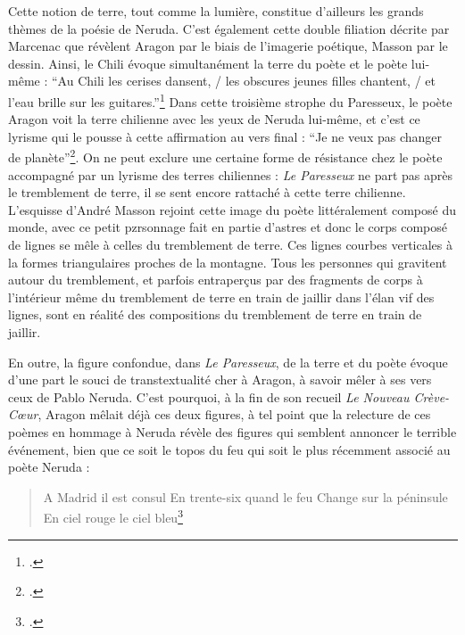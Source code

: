 Cette notion de terre, tout comme la lumière, constitue d’ailleurs les grands thèmes de la poésie de Neruda. C’est également cette double filiation décrite par Marcenac que révèlent Aragon par le biais de l’imagerie poétique, Masson par le dessin. Ainsi, le Chili évoque simultanément la terre du poète et le poète lui-même : \enquote{Au Chili les cerises dansent, / les obscures jeunes filles chantent, / et l'eau brille sur les guitares.}\footcite{pabloneruda} Dans cette troisième strophe du Paresseux, le poète Aragon voit la terre chilienne avec les yeux de Neruda lui-même, et c’est ce lyrisme qui le pousse à cette affirmation au vers final : \enquote{Je ne veux pas changer de planète}\footcite{pabloneruda}.  On ne peut exclure une certaine forme de résistance chez le poète accompagné par un lyrisme des terres chiliennes : \emph{Le Paresseux }ne part pas après le tremblement de terre, il se sent encore rattaché à cette terre chilienne. L’esquisse d’André Masson rejoint cette image du poète littéralement composé du monde, avec ce petit pzrsonnage fait en partie d’astres et donc le corps composé de lignes se mêle à celles du tremblement de terre. Ces lignes courbes verticales à la formes triangulaires proches de la montagne. Tous les personnes qui gravitent autour du tremblement, et parfois entraperçus par des fragments de corps à l’intérieur même du tremblement de terre en train de jaillir dans l’élan vif des lignes, sont en réalité des compositions du tremblement de terre en train de jaillir. 

	En outre, la figure confondue, dans \emph{Le Paresseux}, de la terre et du poète évoque d’une part le souci de transtextualité cher à Aragon, à savoir mêler à ses vers ceux de Pablo Neruda. C’est pourquoi, à la fin de son recueil \emph{Le Nouveau Crève-C\oe{}ur}, Aragon mêlait déjà ces deux figures, à tel point que la relecture de ces poèmes en hommage à Neruda révèle des figures qui semblent annoncer le terrible événement, bien que ce soit le topos du feu qui soit le plus récemment associé au poète Neruda : 

\begin{verse}
A Madrid il est consul 
En trente-six quand le feu
Change sur la péninsule
En ciel rouge le ciel bleu\footcite{pabloneruda}	
\end{verse}
 
